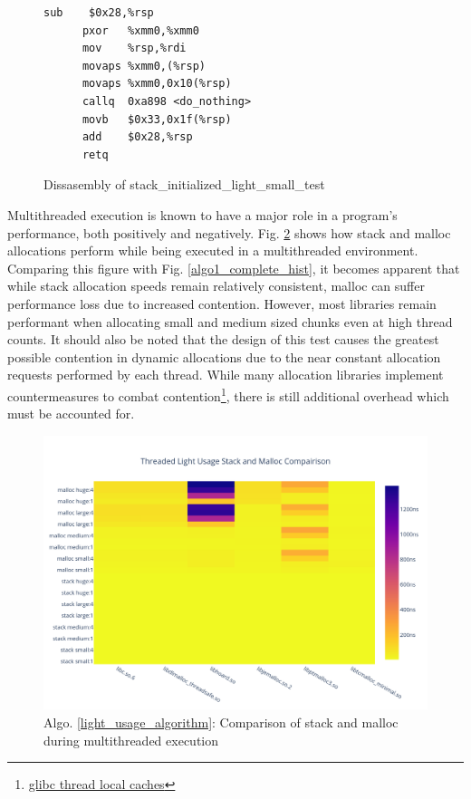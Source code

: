 \documentclass[letterpaper, 10 pt, conference]{ieeeconf}  %
\begin{document}
\begin{figure}[tbh!]
  \centering
    \begin{lstlisting}[language={[x64]Assembler},frame=single]
      sub    $0x28,%rsp
      pxor   %xmm0,%xmm0
      mov    %rsp,%rdi
      movaps %xmm0,(%rsp)
      movaps %xmm0,0x10(%rsp)
      callq  0xa898 <do_nothing>
      movb   $0x33,0x1f(%rsp)
      add    $0x28,%rsp
      retq   
    \end{lstlisting}
  \caption{ Dissasembly of stack\_initialized\_light\_small\_test }
  \label{algo1_init_small_lst}
\end{figure}


Multithreaded execution is known to have a major role in a program's performance, both positively and negatively.
Fig. \ref{algo1_stack_malloc_threaded_hist} shows how stack and malloc allocations perform while being executed in a multithreaded environment.
Comparing this figure with Fig. \ref{algo1_complete_hist}, it becomes apparent that while stack allocation speeds remain relatively consistent, malloc can suffer performance loss due to increased contention.
However, most libraries remain performant when allocating small and medium sized chunks even at high thread counts.
It should also be noted that the design of this test causes the greatest possible contention in dynamic allocations due to the near constant allocation requests performed by each thread. 
While many allocation libraries implement countermeasures to combat contention\footnote{\href{https://sourceware.org/glibc/wiki/MallocInternals\#Thread\_Local\_Cache\_.28tcache.29}{glibc thread local caches}}, there is still additional overhead which must be accounted for.

\begin{figure}[tbh!]
  \centering
  \includegraphics[width=\columnwidth]{graphs/light_stack_malloc_threaded_hist.png}
  \caption{ Algo. \ref{light_usage_algorithm}: Comparison of stack and malloc during multithreaded execution }
  \label{algo1_stack_malloc_threaded_hist}
\end{figure}
\end{document}
